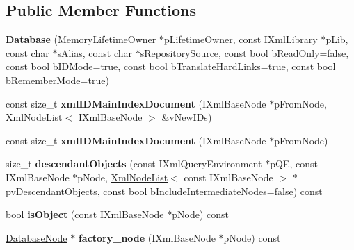\subsection*{\-Public \-Member \-Functions}
\begin{DoxyCompactItemize}
\item 
\hypertarget{classgeneral__server_1_1Database_af76e0f893f0bce4c23b43342a2b8d877}{{\bfseries \-Database} (\hyperlink{classgeneral__server_1_1MemoryLifetimeOwner}{\-Memory\-Lifetime\-Owner} $\ast$p\-Lifetime\-Owner, const \-I\-Xml\-Library $\ast$p\-Lib, const char $\ast$s\-Alias, const char $\ast$s\-Repository\-Source, const bool b\-Read\-Only=false, const bool b\-I\-D\-Mode=true, const bool b\-Translate\-Hard\-Links=true, const bool b\-Remember\-Mode=true)}\label{classgeneral__server_1_1Database_af76e0f893f0bce4c23b43342a2b8d877}

\item 
\hypertarget{classgeneral__server_1_1Database_afa8d0fc88384e536bdbc901db7acb9ce}{const size\-\_\-t {\bfseries xml\-I\-D\-Main\-Index\-Document} (\-I\-Xml\-Base\-Node $\ast$p\-From\-Node, \hyperlink{classgeneral__server_1_1XmlNodeList}{\-Xml\-Node\-List}$<$ \-I\-Xml\-Base\-Node $>$ \&v\-New\-I\-Ds)}\label{classgeneral__server_1_1Database_afa8d0fc88384e536bdbc901db7acb9ce}

\item 
\hypertarget{classgeneral__server_1_1Database_a4f4dbbd587554df0276f04d378b9e833}{const size\-\_\-t {\bfseries xml\-I\-D\-Main\-Index\-Document} (\-I\-Xml\-Base\-Node $\ast$p\-From\-Node)}\label{classgeneral__server_1_1Database_a4f4dbbd587554df0276f04d378b9e833}

\item 
\hypertarget{classgeneral__server_1_1Database_ad7d18467646748b7611a16d76647da9b}{size\-\_\-t {\bfseries descendant\-Objects} (const \-I\-Xml\-Query\-Environment $\ast$p\-Q\-E, const \-I\-Xml\-Base\-Node $\ast$p\-Node, \hyperlink{classgeneral__server_1_1XmlNodeList}{\-Xml\-Node\-List}$<$ const \-I\-Xml\-Base\-Node $>$ $\ast$pv\-Descendant\-Objects, const bool b\-Include\-Intermediate\-Nodes=false) const }\label{classgeneral__server_1_1Database_ad7d18467646748b7611a16d76647da9b}

\item 
\hypertarget{classgeneral__server_1_1Database_a319c51aedef3956b1e4648bd689754ea}{bool {\bfseries is\-Object} (const \-I\-Xml\-Base\-Node $\ast$p\-Node) const }\label{classgeneral__server_1_1Database_a319c51aedef3956b1e4648bd689754ea}

\item 
\hypertarget{classgeneral__server_1_1Database_a157176fe2ff69f02d5073e1a060f3b86}{\hyperlink{classgeneral__server_1_1DatabaseNode}{\-Database\-Node} $\ast$ {\bfseries factory\-\_\-node} (\-I\-Xml\-Base\-Node $\ast$p\-Node) const }\label{classgeneral__server_1_1Database_a157176fe2ff69f02d5073e1a060f3b86}


\end{DoxyCompactItemize}
